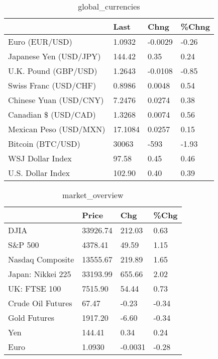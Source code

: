 \documentclass{article}%
\begin{document}
%


\begin{table}[htbp]%
\caption{global\_currencies}%
\centering%
\begin{adjustbox}{width=1\textwidth}%
\begin{tabular}{llll}
\toprule
                       &    Last &    Chng & \%Chng \\
\midrule
        Euro (EUR/USD) &  1.0932 & -0.0029 & -0.26 \\
Japanese Yen (USD/JPY) &  144.42 &    0.35 &  0.24 \\
  U.K. Pound (GBP/USD) &  1.2643 & -0.0108 & -0.85 \\
 Swiss Franc (USD/CHF) &  0.8986 &  0.0048 &  0.54 \\
Chinese Yuan (USD/CNY) &  7.2476 &  0.0274 &  0.38 \\
  Canadian \$ (USD/CAD) &  1.3268 &  0.0074 &  0.56 \\
Mexican Peso (USD/MXN) & 17.1084 &  0.0257 &  0.15 \\
     Bitcoin (BTC/USD) &   30063 &    -593 & -1.93 \\
      WSJ Dollar Index &   97.58 &    0.45 &  0.46 \\
     U.S. Dollar Index &  102.90 &    0.40 &  0.39 \\
\bottomrule
\end{tabular}
%
\end{adjustbox}%
\end{table}

%


\begin{table}[htbp]%
\caption{market\_overview}%
\centering%
\begin{adjustbox}{width=1\textwidth}%
\begin{tabular}{llll}
\toprule
                  &    Price &     Chg &  \%Chg \\
\midrule
             DJIA & 33926.74 &  212.03 &  0.63 \\
          S\&P 500 &  4378.41 &   49.59 &  1.15 \\
 Nasdaq Composite & 13555.67 &  219.89 &  1.65 \\
Japan: Nikkei 225 & 33193.99 &  655.66 &  2.02 \\
     UK: FTSE 100 &  7515.90 &   54.44 &  0.73 \\
Crude Oil Futures &    67.47 &   -0.23 & -0.34 \\
     Gold Futures &  1917.20 &   -6.60 & -0.34 \\
              Yen &   144.41 &    0.34 &  0.24 \\
             Euro &   1.0930 & -0.0031 & -0.28 \\
\bottomrule
\end{tabular}
%
\end{adjustbox}%
\end{table}

%
\end{document}
